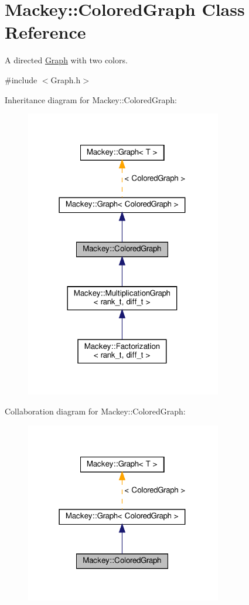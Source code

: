 \hypertarget{classMackey_1_1ColoredGraph}{}\section{Mackey\+:\+:Colored\+Graph Class Reference}
\label{classMackey_1_1ColoredGraph}


A directed \hyperlink{classMackey_1_1Graph}{Graph} with two colors.  




{\ttfamily \#include $<$Graph.\+h$>$}



Inheritance diagram for Mackey\+:\+:Colored\+Graph\+:\nopagebreak
\begin{figure}[H]
\begin{center}
\leavevmode
\includegraphics[width=243pt]{classMackey_1_1ColoredGraph__inherit__graph}
\end{center}
\end{figure}


Collaboration diagram for Mackey\+:\+:Colored\+Graph\+:\nopagebreak
\begin{figure}[H]
\begin{center}
\leavevmode
\includegraphics[width=243pt]{classMackey_1_1ColoredGraph__coll__graph}
\end{center}
\end{figure}
